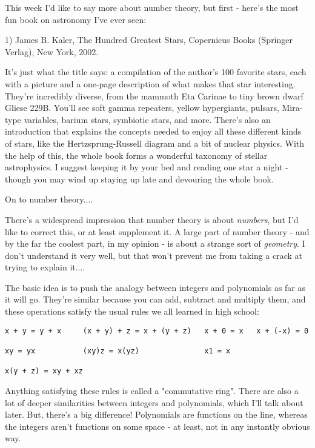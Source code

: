 



This week I'd like to say more about number theory, but first - 
here's the most fun book on astronomy I've ever seen:

1) James B. Kaler, The Hundred Greatest Stars, Copernicus Books
(Springer Verlag), New York, 2002.

It's just what the title says: a compilation of the author's 100
favorite stars, each with a picture and a one-page description of what 
makes that star interesting.  They're incredibly diverse, from the 
mammoth Eta Carinae to tiny brown dwarf Gliese 229B.  You'll see soft 
gamma repeaters, yellow hypergiants, pulsars, Mira-type variables, 
barium stars, symbiotic stars, and more.  There's also an introduction 
that explains the concepts needed to enjoy all these different kinds of 
stars, like the Hertzsprung-Russell diagram and a bit of nuclear physics.  
With the help of this, the whole book forms a wonderful taxonomy of 
stellar astrophysics.  I suggest keeping it by your bed and reading one 
star a night - though you may wind up staying up late and devouring the 
whole book.

On to number theory....

There's a widespread impression that number theory is about \emph{numbers}, 
but I'd like to correct this, or at least supplement it.  A large part 
of number theory - and by the far the coolest part, in my opinion - is 
about a strange sort of \emph{geometry}.  I don't understand it very well, 
but that won't prevent me from taking a crack at trying to explain it....

The basic idea is to push the analogy between integers and polynomials 
as far as it will go.  They're similar because you can add, subtract and
multiply them, and these operations satisfy the usual rules we all 
learned in high school:

\begin{verbatim}
x + y = y + x     (x + y) + z = x + (y + z)   x + 0 = x   x + (-x) = 0

xy = yx           (xy)z = x(yz)               x1 = x

x(y + z) = xy + xz
\end{verbatim}
    

Anything satisfying these rules is called a "commutative ring".
There are also a lot of deeper similarities between integers and
polynomials, which I'll talk about later.  But, there's a big difference!  
Polynomials are functions on the line, whereas the integers aren't 
functions on some space - at least, not in any instantly obvious way.  

